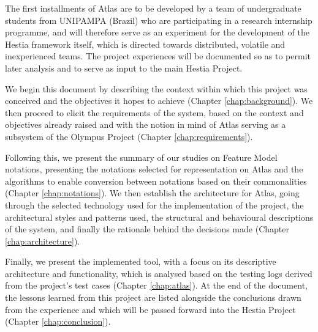 The first installments of Atlas are to be developed by a team of undergraduate students from UNIPAMPA (Brazil) who are participating in a research internship programme, and will therefore serve as an experiment for the development of the Hestia framework itself, which is directed towards distributed, volatile and inexperienced teams. The project experiences will be documented so as to permit later analysis and to serve as input to the main Hestia Project.

We begin this document by describing the context within which this project was conceived and the objectives it hopes to achieve (Chapter \ref{chap:background}). We then proceed to elicit the requirements of the system, based on the context and objectives already raised and with the notion in mind of Atlas serving as a subsystem of the Olympus Project (Chapter \ref{chap:requirements}).

Following this, we present the summary of our studies on Feature Model notations, presenting the notations selected for representation on Atlas and the algorithms to enable conversion between notations based on their commonalities (Chapter \ref{chap:notations}). We then establish the architecture for Atlas, going through the selected technology used for the implementation of the project, the architectural styles and patterns used, the structural and behavioural descriptions of the system, and finally the rationale behind the decisions made \cite{PERRY:1992} (Chapter \ref{chap:architecture}).

Finally, we present the implemented tool, with a focus on its descriptive architecture and functionality, which is analysed based on the testing logs derived from the project's test cases (Chapter \ref{chap:atlas}). At the end of the document, the lessons learned from this project are listed alongside the conclusions drawn from the experience and which will be passed forward into the Hestia Project (Chapter \ref{chap:conclusion}).